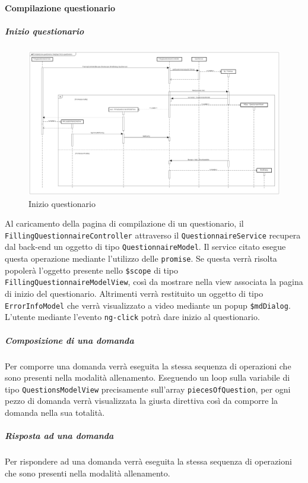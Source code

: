 \paragraph{Compilazione questionario}

\subparagraph{Inizio questionario}

\label{Inizio questionario}

\begin{figure}[ht]
	\centering
	\includegraphics[scale=0.25,keepaspectratio]{UML/DiagrammiDiSequenza/Front-end/Quiz_start.png}
	\caption{Inizio questionario}
\end{figure} \FloatBarrier

Al caricamento della pagina di compilazione di un questionario, il \texttt{FillingQuestionnaireController} attraverso il \texttt{QuestionnaireService} recupera dal back-end un oggetto di tipo \texttt{QuestionnaireModel}. Il service citato esegue questa operazione mediante l'utilizzo delle \texttt{promise}. Se questa verrà risolta popolerà l'oggetto presente nello \texttt{\$scope} di tipo \texttt{FillingQuestionnaireModelView}, così da mostrare nella view associata la pagina di inizio del questionario. Altrimenti verrà restituito un oggetto di tipo \texttt{ErrorInfoModel} che verrà visualizzato a video mediante un popup \texttt{\$mdDialog}. \\
L'utente mediante l'evento \texttt{ng-click} potrà dare inizio al questionario. 

\subparagraph{Composizione di una domanda}

Per comporre una domanda verrà eseguita la stessa sequenza di operazioni che sono presenti nella modalità allenamento. Eseguendo un loop sulla variabile di tipo \texttt{QuestionsModelView} precisamente sull'array \texttt{piecesOfQuestion}, per ogni pezzo di domanda verrà visualizzata la giusta direttiva così da comporre la domanda nella sua totalità.

\subparagraph{Risposta ad una domanda}

Per rispondere ad una domanda verrà eseguita la stessa sequenza di operazioni che sono presenti nella modalità allenamento.


